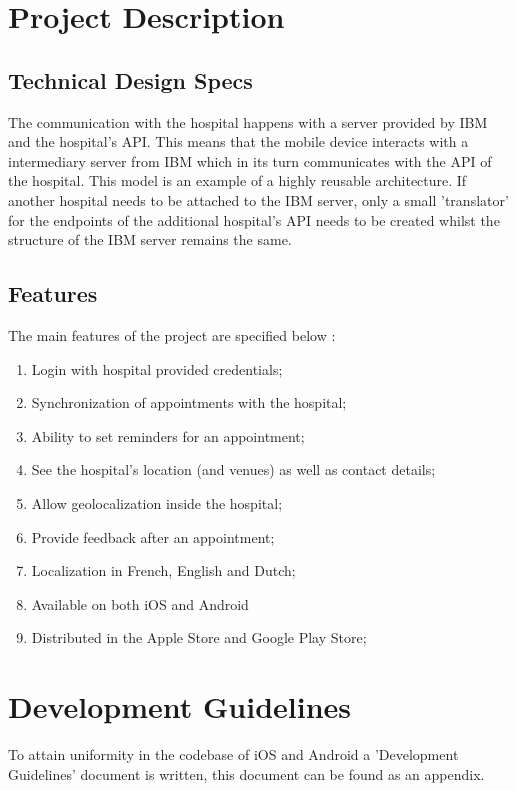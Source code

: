 \section{Project Description}
\subsection{Technical Design Specs}
The communication with the hospital happens with a server provided by IBM and the hospital's API. This means that the mobile device interacts with a intermediary server from IBM which in its turn communicates with the API of the hospital. This model is an example of a highly reusable architecture. If another hospital needs to be attached to the IBM server, only a small 'translator' for the endpoints of the additional hospital's API needs to be created whilst the structure of the IBM server remains the same.
\subsection{Features}
The main features of the project are specified below \cite{medappspec}:
\begin{enumerate}
\item Login with hospital provided credentials;
\item Synchronization of appointments with the hospital;
\item Ability to set reminders for an appointment;
\item See the hospital's location (and venues) as well as contact details;
\item Allow geolocalization inside the hospital;
\item Provide feedback after an appointment;
\item Localization in French, English and Dutch;
\item Available on both iOS and Android
\item Distributed in the Apple Store and Google Play Store;
\end{enumerate}
\section{Development Guidelines}
To attain uniformity in the codebase of iOS and Android a 'Development Guidelines' document is written, this document can be found as an appendix.